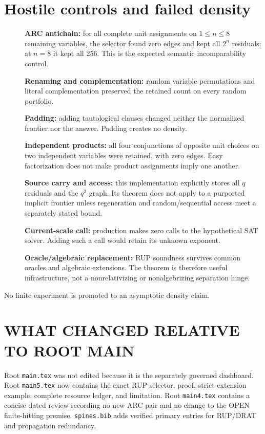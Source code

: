\documentclass[11pt]{article}
\begin{document}
\section*{Hostile controls and failed density}
\begin{description}
\item[] \textbf{ARC antichain:} for all complete unit assignments on
$1\leq n\leq8$ remaining variables, the selector found zero edges and kept
all $2^n$ residuals; at $n=8$ it kept all 256.  This is the expected semantic
incomparability control.
\item[] \textbf{Renaming and complementation:} random variable permutations
and literal complementation preserved the retained count on every random
portfolio.
\item[] \textbf{Padding:} adding tautological clauses changed neither the
normalized frontier nor the answer.  Padding creates no density.
\item[] \textbf{Independent products:} all four conjunctions of opposite
unit choices on two independent variables were retained, with zero edges.
Easy factorization does not make product assignments imply one another.
\item[] \textbf{Source carry and access:} this implementation explicitly
stores all $q$ residuals and the $q^2$ graph.  Its theorem does not apply to a
purported implicit frontier unless regeneration and random/sequential access
meet a separately stated bound.
\item[] \textbf{Current-scale call:} production makes zero calls to the
hypothetical SAT solver.  Adding such a call would retain its unknown exponent.
\item[] \textbf{Oracle/algebraic replacement:} RUP soundness survives common
oracles and algebraic extensions.  The theorem is therefore useful
infrastructure, not a nonrelativizing or nonalgebrizing separation hinge.
\end{description}
No finite experiment is promoted to an asymptotic density claim.

\section*{WHAT CHANGED RELATIVE TO ROOT MAIN}
Root \texttt{main.tex} was not edited because it is the separately governed
dashboard.  Root \texttt{main5.tex} now contains the exact RUP selector,
proof, strict-extension example, complete resource ledger, and limitation.
Root \texttt{main4.tex} contains a concise dated review recording no new ARC
pair and no change to the OPEN finite-hitting premise.  \texttt{spines.bib}
adds verified primary entries for RUP/DRAT and propagation redundancy.
\end{document}
